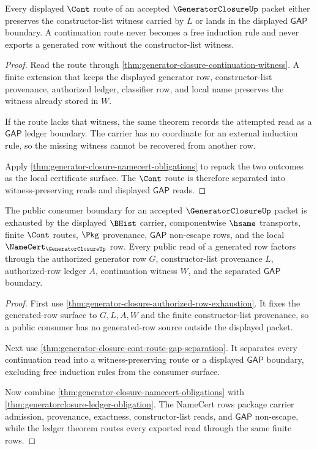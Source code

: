 \begin{theorem}
\label{thm:generator-closure-cont-route-gap-separation}
Every displayed $\Cont$ route of an accepted $\GeneratorClosureUp$ packet either preserves the constructor-list witness carried by $L$ or lands in the displayed $\mathsf{GAP}$ boundary. A continuation route never becomes a free induction rule and never exports a generated row without the constructor-list witness.
\end{theorem}
\begin{proof}
Read the route through \autoref{thm:generator-closure-continuation-witness}. A finite extension that keeps the displayed generator row, constructor-list provenance, authorized ledger, classifier row, and local name preserves the witness already stored in $W$.

If the route lacks that witness, the same theorem records the attempted read as a $\mathsf{GAP}$ ledger boundary. The carrier has no coordinate for an external induction rule, so the missing witness cannot be recovered from another row.

Apply \autoref{thm:generator-closure-namecert-obligations} to repack the two outcomes as the local certificate surface. The $\Cont$ route is therefore separated into witness-preserving reads and displayed $\mathsf{GAP}$ reads.
\end{proof}

\begin{theorem}
\label{thm:generator-closure-namecert-public-consumer-boundary}
The public consumer boundary for an accepted $\GeneratorClosureUp$ packet is exhausted by the displayed $\BHist$ carrier, componentwise $\hsame$ transports, finite $\Cont$ routes, $\Pkg$ provenance, $\mathsf{GAP}$ non-escape rows, and the local $\NameCert_{\GeneratorClosureUp}$ row. Every public read of a generated row factors through the authorized generator row $G$, constructor-list provenance $L$, authorized-row ledger $A$, continuation witness $W$, and the separated $\mathsf{GAP}$ boundary.
\end{theorem}
\begin{proof}
First use \autoref{thm:generator-closure-authorized-row-exhaustion}. It fixes the generated-row surface to $G,L,A,W$ and the finite constructor-list provenance, so a public consumer has no generated-row source outside the displayed packet.

Next use \autoref{thm:generator-closure-cont-route-gap-separation}. It separates every continuation read into a witness-preserving route or a displayed $\mathsf{GAP}$ boundary, excluding free induction rules from the consumer surface.

Now combine \autoref{thm:generator-closure-namecert-obligations} with \autoref{thm:generatorclosure-ledger-obligation}. The NameCert rows package carrier admission, provenance, exactness, constructor-list reads, and $\mathsf{GAP}$ non-escape, while the ledger theorem routes every exported read through the same finite rows.
\end{proof}

